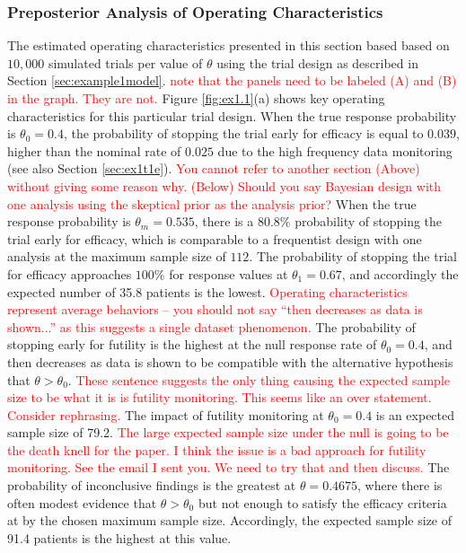 \documentclass[useAMS,usenatbib,referee]{biom}
\begin{document}
\subsubsection{Preposterior Analysis of Operating Characteristics}\label{sec:ex1.1}
The estimated operating characteristics presented in this section based based on $10,000$ simulated trials per value of $\theta$ using the trial design as described in Section \ref{sec:example1model}. 
%
\textcolor{red}{note that the panels need to be labeled (A) and (B) in the graph. They are not.}
Figure \ref{fig:ex1.1}(a) shows key operating characteristics for this particular trial design.
%
When the true response probability is $\theta_0=0.4$, the probability of stopping the trial early for efficacy is equal to $0.039$, higher than the nominal rate of 
$0.025$ due to the high frequency data monitoring (see also Section \ref{sec:ex1t1e}). 
%
\textcolor{red}{You cannot refer to another section (Above) without giving some reason why. 
(Below) Should you say Bayesian design with one analysis using the skeptical prior as the analysis prior?}
%
When the true response probability is $\theta_m=0.535$, there is a $80.8\%$ probability of stopping the trial early for efficacy, which is comparable to a frequentist design with one analysis at the maximum sample size of $112$. 
%
The probability of stopping the trial for efficacy approaches $100\%$ for response values at $\theta_1=0.67$, and accordingly the expected number of 35.8 patients is the lowest.
%
\textcolor{red}{Operating characteristics represent average behaviors -- you should not say ``then decreases as data is shown...'' as this suggests a single dataset phenomenon.}
%
The probability of stopping early for futility is the highest at the null response rate of $\theta_0=0.4$, and then decreases as data is shown to be compatible with the alternative hypothesis that $\theta>\theta_0$. 
%
\textcolor{red}{These sentence suggests the only thing causing the expected sample size to be what it is is futility monitoring. This seems like an over statement. Consider rephrasing.}
%
The impact of futility monitoring at $\theta_0=0.4$ is an expected sample size of 79.2.
%
\textcolor{red}{The large expected sample size under the null is going to be the death knell for the paper. 
	I think the issue is a bad approach for futility monitoring. See the email I sent you. We need to try that and then discuss. 
	}
%
The probability of inconclusive findings is the greatest at $\theta=0.4675$, where there is often modest evidence that $\theta>\theta_0$ but not enough to satisfy the efficacy criteria at by the chosen maximum sample size. Accordingly, the expected sample size of 91.4 patients is the highest at this value.
\end{document}
